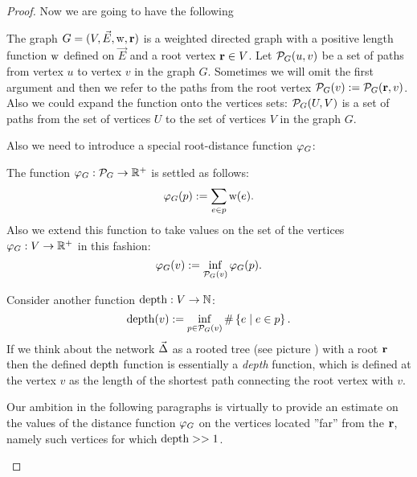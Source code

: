 \documentclass[12pt]{article}
\begin{document}
\begin{proof}
      Now we are going to have the following
      \begin{definition}
        The graph $G = (V, \vec{E},\mathrm{w}, \mathbf{r})$ is a weighted directed graph with a positive
          length function $\mathrm{w}$ defined on $\vec{E}$ and a root vertex $\mathbf{r} \in V$.
        Let $\mathcal{P}_{G}(u, v)$ be a set of paths from vertex $u$ to vertex $v$ in the graph $G$.
        Sometimes we will omit the first argument and then we refer to the paths from the root vertex
          $\mathcal{P}_{G}(v) := \mathcal{P}_{G}(\mathbf{r}, v)$.
        Also we could expand the function onto the vertices sets: $\mathcal{P}_{G}(U,V)$ is a set of paths
          from the set of vertices $U$ to the set of vertices $V$ in the graph $G$.
      \end{definition}
      Also we need to introduce a special root-distance function $\varphi_{G}$:
      \begin{definition}
        The function $\varphi_{G}: \mathcal{P}_{G} \to \mathbb{R}^{+}$ is settled as follows:
        \[
          \varphi_{G}(p) := \sum_{e \in p} \mathrm{w}(e).
        \]
        Also we extend this function to take values on the set of the vertices $\varphi_{G}: V \to \mathbb{R}^{+}$ in this fashion:
        \[
          \varphi_{G}(v) := \inf_{\mathcal{P}_{G}(v)} \varphi_{G}(p).
        \]
      \end{definition}
      \begin{remark}
        Consider another function $\operatorname{depth}: V \to \mathbb{N}$:
        \[
          \operatorname{depth}(v) := \inf_{p \in \mathcal{P}_{G}(v)} \#\left\{e \mid e \in p\right\}.
        \]
        If we think about the network $\vec{\Delta}$ as a rooted tree (see picture ) with a root $\mathbf{r}$
          then the defined $\operatorname{depth}$ function is essentially a \emph{depth} function, which is defined at the vertex $v$ 
          as the length of the shortest path connecting the root vertex with $v$.

        Our ambition in the following paragraphs is virtually to provide an estimate on the values of the distance function $\varphi_{G}$ on the vertices
          located ''far'' from the $\mathbf{r}$, namely such vertices for which $\operatorname{depth} >> 1$.
      \end{remark}


\end{proof}
\end{document}
